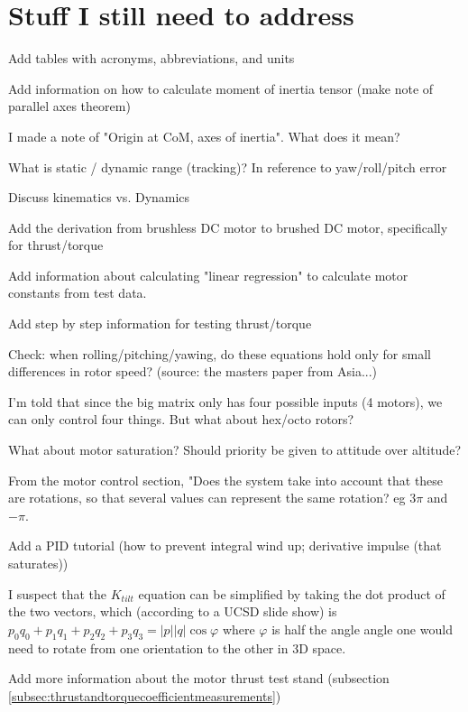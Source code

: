 \documentclass{article}
\numberwithin{equation}{section} %
\begin{document}
\section{Stuff I still need to address}
\begin{list}{*}{}
	\item Add tables with acronyms, abbreviations, and units
	\item Add information on how to calculate moment of inertia tensor (make note of parallel axes theorem)
	\item I made a note of "Origin at CoM, axes of inertia". What does it mean?
	\item What is static / dynamic range (tracking)? In reference to yaw/roll/pitch error
	\item Discuss kinematics vs. Dynamics
	\item Add the derivation from brushless DC motor to brushed DC motor, specifically for thrust/torque
	\item Add information about calculating "linear regression" to calculate motor constants from test data.
	\item Add step by step information for testing thrust/torque
	\item Check: when rolling/pitching/yawing, do these equations hold only for small differences in rotor speed? (source: the masters paper from Asia...)
	\item I'm told that since the big matrix only has four possible inputs (4 motors), we can only control four things. But what about hex/octo rotors?
	\item What about motor saturation? Should priority be given to attitude over altitude?
	\item From the motor control section, "Does the system take into account that these are rotations, so that several values can represent the same rotation? eg $3\pi$ and $-\pi$.
	\item Add a PID tutorial (how to prevent integral wind up; derivative impulse (that saturates))
	\item I suspect that the $K_{tilt}$ equation can be simplified by taking the dot product of the two vectors, which (according to a UCSD slide show) is $p_0 q_0 +p_1 q_1 + p_2 q_2 + p_3 q_3 = |p||q| \cos \varphi$ where $\varphi$ is half the angle angle one would need to rotate from one orientation to the other in 3D space.
	\item Add more information about the motor thrust test stand (subsection \ref{subsec:thrustandtorquecoefficientmeasurements})

\end{list}
\end{document}
